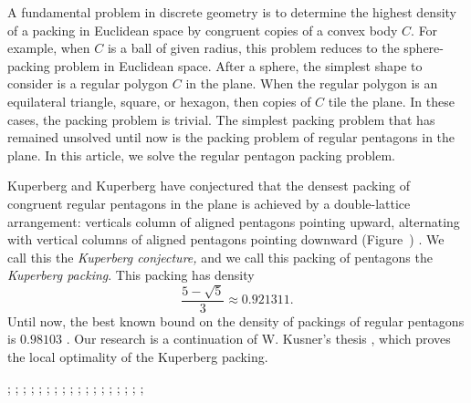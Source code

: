 A fundamental problem in discrete geometry is to determine the highest density of a packing
in Euclidean space by congruent copies of a convex body $C$.   For example, when $C$ is a ball
of given radius, this problem reduces to the sphere-packing problem in Euclidean space.
After a sphere, the simplest shape to consider is a regular polygon $C$ in the plane.
When the regular polygon is an equilateral triangle, square, or hexagon, then copies of $C$ tile
the plane.  In these cases, the packing problem is trivial.  The simplest packing problem
that has remained unsolved until now is the packing problem of regular pentagons in the plane.
In this article, we solve the regular pentagon packing problem.

Kuperberg and Kuperberg
 have conjectured that the
densest packing of congruent regular pentagons in the plane is
achieved by a double-lattice arrangement: verticals column of aligned
pentagons pointing upward, alternating with vertical columns of
aligned pentagons pointing downward (Figure~) \cite{Kup}.  We call this the {\it Kuperberg
  conjecture,}  and we call this packing of pentagons the {\it Kuperberg packing}.
This packing has density
\[
\frac{5 - \sqrt{5}}3 \approx 0.921311.
\] %
Until now, the best known bound on the density of packings of regular
pentagons is $0.98103$ \cite{Val}.
Our research is a continuation of W. Kusner's thesis \cite{Kus}, which proves
the local optimality of the Kuperberg packing.


{
;  %
;  %
;  
;  %
; 
;  
;  
;  %
; 
;  
;  
;  %
;  %
; 
;  %
; 
;  
;   
}


